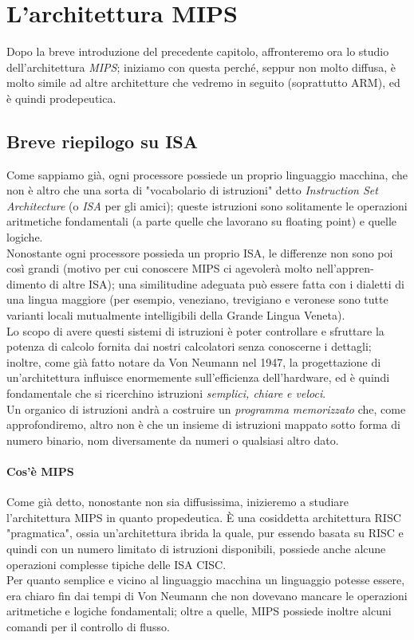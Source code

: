 \documentclass[class=book, crop=false]{standalone}
\begin{document}
\chapter{L'architettura MIPS}

Dopo la breve introduzione del precedente capitolo, affronteremo ora lo studio dell'architettura \textit{MIPS}; iniziamo con questa perché, seppur non molto diffusa, è molto simile ad altre architetture che vedremo in seguito (soprattutto ARM), ed è quindi prodepeutica.

\section{Breve riepilogo su ISA}
Come sappiamo già, ogni processore possiede un proprio linguaggio macchina, che non è altro che una sorta di "vocabolario di istruzioni" detto \emph{Instruction Set Architecture} (o \emph{ISA} per gli amici); queste istruzioni sono solitamente le operazioni aritmetiche fondamentali (a parte quelle che lavorano su floating point) e quelle logiche. \\
Nonostante ogni processore possieda un proprio ISA, le differenze non sono poi così grandi (motivo per cui conoscere MIPS ci agevolerà molto nell'appren-dimento di altre ISA); una similitudine adeguata può essere fatta con i dialetti di una lingua maggiore (per esempio, veneziano, trevigiano e veronese sono tutte varianti locali mutualmente intelligibili della Grande Lingua Veneta).\\
Lo scopo di avere questi sistemi di istruzioni è poter controllare e sfruttare la potenza di calcolo fornita dai nostri calcolatori senza conoscerne i dettagli; inoltre, come già fatto notare da Von Neumann nel 1947, la progettazione di un'architettura influisce enormemente sull'efficienza dell'hardware, ed è quindi fondamentale che si ricerchino istruzioni \emph{semplici, chiare e veloci}.\\
Un organico di istruzioni andrà a costruire un \emph{programma memorizzato} che, come approfondiremo, altro non è che un insieme di istruzioni mappato sotto forma di numero binario, nom diversamente da numeri o qualsiasi altro dato.

\subsubsection{Cos'è MIPS}
Come già detto, nonostante non sia diffusissima, inizieremo a studiare l'architettura MIPS in quanto propedeutica. È una cosiddetta architettura RISC "pragmatica", ossia un'architettura ibrida la quale, pur essendo basata su RISC e quindi con un numero limitato di istruzioni disponibili, possiede anche alcune operazioni complesse tipiche delle ISA CISC.\\
Per quanto semplice e vicino al linguaggio macchina un linguaggio potesse essere, era chiaro fin dai tempi di Von Neumann che non dovevano mancare le operazioni aritmetiche e logiche fondamentali; oltre a quelle, MIPS possiede inoltre alcuni comandi per il controllo di flusso.
\end{document}
